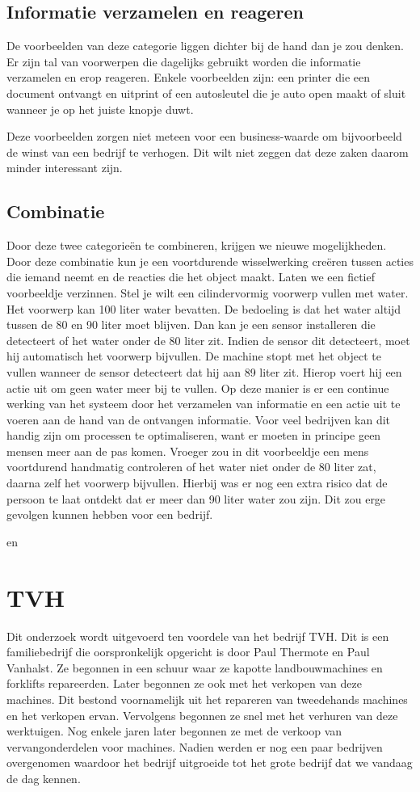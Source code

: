 \subsection{Informatie verzamelen en reageren}
De voorbeelden van deze categorie liggen dichter bij de hand dan je zou denken. Er zijn tal van voorwerpen die dagelijks gebruikt worden die informatie verzamelen en erop reageren. Enkele voorbeelden zijn: een printer die een document ontvangt en uitprint of een autosleutel die je auto open maakt of sluit wanneer je op het juiste knopje duwt.

Deze voorbeelden zorgen niet meteen voor een business-waarde om bijvoorbeeld de winst van een bedrijf te verhogen. Dit wilt niet zeggen dat deze zaken daarom minder interessant zijn.

\subsection{Combinatie}
Door deze twee categorieën te combineren, krijgen we nieuwe mogelijkheden. Door deze combinatie kun je een voortdurende wisselwerking creëren tussen acties die iemand neemt en de reacties die het object maakt. Laten we een fictief voorbeeldje verzinnen. Stel je wilt een cilindervormig voorwerp vullen met water. Het voorwerp kan 100 liter water bevatten. De bedoeling is dat het water altijd tussen de 80 en 90 liter moet blijven. Dan kan je een sensor installeren die detecteert of het water onder de 80 liter zit. Indien de sensor dit detecteert, moet hij automatisch het voorwerp bijvullen. De machine stopt met het object te vullen wanneer de sensor detecteert dat hij aan 89 liter zit. Hierop voert hij een actie uit om geen water meer bij te vullen. Op deze manier is er een continue werking van het systeem door het verzamelen van informatie en een actie uit te voeren aan de hand van de ontvangen informatie. Voor veel bedrijven kan dit handig zijn om processen te optimaliseren, want er moeten in principe geen mensen meer aan de pas komen. Vroeger zou in dit voorbeeldje een mens voortdurend handmatig controleren of het water niet onder de 80 liter zat, daarna zelf het voorwerp bijvullen. Hierbij was er nog een extra risico dat de persoon te laat ontdekt dat er meer dan 90 liter water zou zijn. Dit zou erge gevolgen kunnen hebben voor een bedrijf.

\autocite{McClelland2019} en \autocite{i-scoop2019}

\section{TVH}
Dit onderzoek wordt uitgevoerd ten voordele van het bedrijf TVH. Dit is een familiebedrijf die oorspronkelijk opgericht is door Paul Thermote en Paul Vanhalst. Ze begonnen in een schuur waar ze kapotte landbouwmachines en forklifts repareerden. Later begonnen ze ook met het verkopen van deze machines. Dit bestond voornamelijk uit het repareren van tweedehands machines en het verkopen ervan. Vervolgens begonnen ze snel met het verhuren van deze werktuigen. Nog enkele jaren later begonnen ze met de verkoop van vervangonderdelen voor machines. Nadien werden er nog een paar bedrijven overgenomen waardoor het bedrijf uitgroeide tot het grote bedrijf dat we vandaag de dag kennen. 


